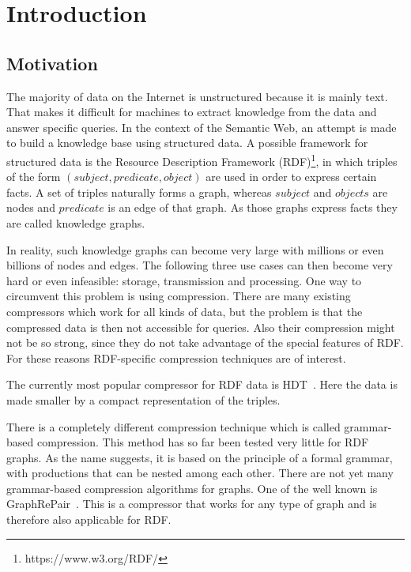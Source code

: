 \chapter{Introduction}\label{ch:introduction}

\section{Motivation}
The majority of data on the Internet is unstructured because it is mainly text. That makes it difficult for machines to extract knowledge from the data and answer specific queries. In the context of the Semantic Web, an attempt is made to build a knowledge base using structured data. A possible framework for structured data is the Resource Description Framework (RDF)\footnote{https://www.w3.org/RDF/}, in which triples of the form $ (subject, predicate, object) $ are used in order to express certain facts. A set of triples naturally forms a graph, whereas $subject$ and $objects$ are nodes and $predicate$ is an edge of that graph. As those graphs express facts they are called knowledge graphs.

In reality, such knowledge graphs can become very large with millions or even billions of nodes and edges.  The following three use cases can then become very hard or even infeasible: storage, transmission and processing. One way to circumvent this problem is using compression. There are many existing compressors which work for all kinds of data, but the problem is that the compressed data is then not accessible for queries. Also their compression might not be so strong, since they do not take advantage of the special features of RDF. For these reasons RDF-specific compression techniques are of interest.

The currently most popular compressor for RDF data is HDT~\cite{hdt}. Here the data is made smaller by a compact representation of the triples. 

There is a completely different compression technique which is called grammar-based compression. This method has so far been tested very little for RDF graphs. As the name suggests, it is based on the principle of a formal grammar, with productions that can be nested among each other. There are not yet many grammar-based compression algorithms for graphs. One of the well known is GraphRePair~\cite{maneth}. This is a compressor that works for any type of graph and is therefore also applicable for RDF.

